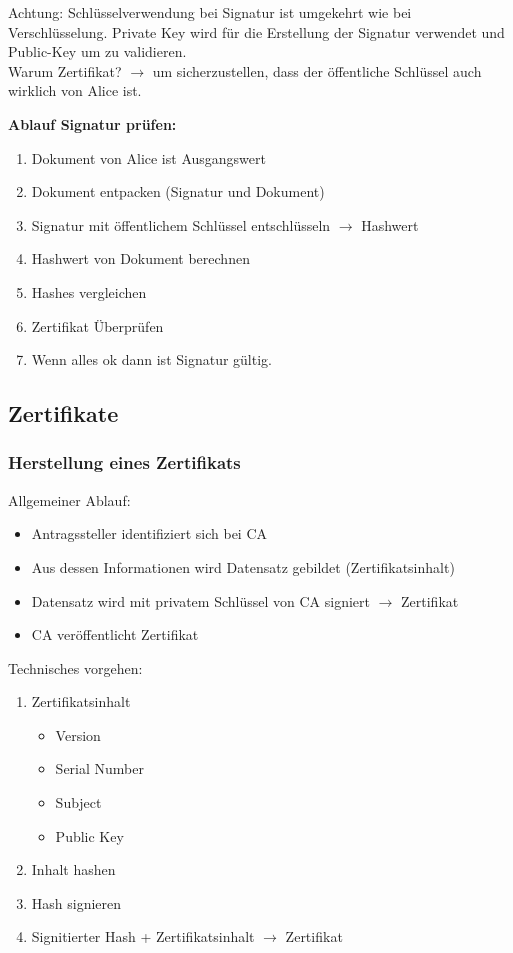 \documentclass[12pt]{scrartcl}
\begin{document}
Achtung: Schlüsselverwendung bei Signatur ist umgekehrt wie bei Verschlüsselung. Private Key
wird für die Erstellung der Signatur verwendet und Public-Key um zu validieren.\\

Warum Zertifikat? $\rightarrow$ um sicherzustellen, dass der öffentliche Schlüssel auch wirklich
von Alice ist.

\newpage
\textbf{Ablauf Signatur prüfen:}
\begin{enumerate}
    \item Dokument von Alice ist Ausgangswert
    \item Dokument entpacken (Signatur und Dokument)
    \item Signatur mit öffentlichem Schlüssel entschlüsseln $\rightarrow$ Hashwert
    \item Hashwert von Dokument berechnen
    \item Hashes vergleichen
    \item Zertifikat Überprüfen
    \item Wenn alles ok dann ist Signatur gültig.
\end{enumerate}


\subsection{Zertifikate}

\subsubsection{Herstellung eines Zertifikats}


Allgemeiner Ablauf:
\begin{itemize}
    \item Antragssteller identifiziert sich bei CA
    \item Aus dessen Informationen wird Datensatz gebildet (Zertifikatsinhalt)
    \item Datensatz wird mit privatem Schlüssel von CA signiert $\rightarrow$ Zertifikat 
    \item CA veröffentlicht Zertifikat
\end{itemize}


Technisches vorgehen:
\begin{enumerate}
    \item Zertifikatsinhalt
          \begin{itemize}
              \item Version
              \item Serial Number
              \item Subject
              \item Public Key
          \end{itemize}
    \item Inhalt hashen
    \item Hash signieren
    \item Signitierter Hash + Zertifikatsinhalt $\rightarrow$ Zertifikat
\end{enumerate}
\end{document}
